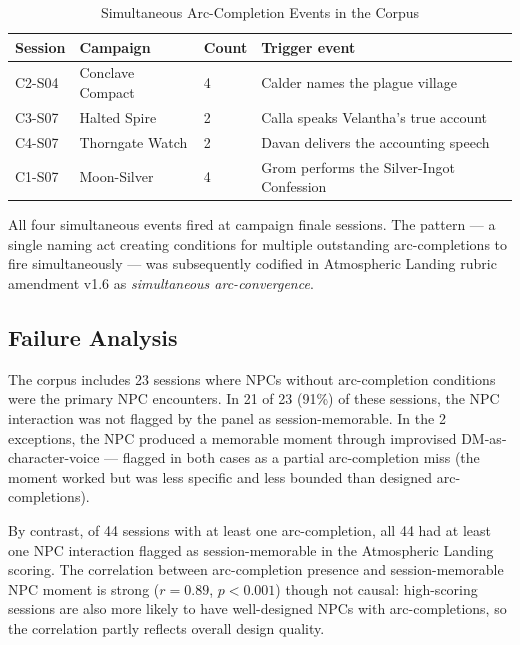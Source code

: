 \begin{table}[t]
\caption{Simultaneous Arc-Completion Events in the Corpus}
\label{tab:simultaneous}
\begin{tabular}{@{}lllp{4cm}@{}}
\toprule
Session & Campaign & Count & Trigger event \\
\midrule
C2-S04 & Conclave Compact & 4 & Calder names the plague village \\
C3-S07 & Halted Spire & 2 & Calla speaks Velantha's true account \\
C4-S07 & Thorngate Watch & 2 & Davan delivers the accounting speech \\
C1-S07 & Moon-Silver & 4 & Grom performs the Silver-Ingot Confession \\
\bottomrule
\end{tabular}
\end{table}

All four simultaneous events fired at campaign finale sessions. The pattern --- a single
naming act creating conditions for multiple outstanding arc-completions to fire
simultaneously --- was subsequently codified in Atmospheric Landing rubric amendment v1.6
as \textit{simultaneous arc-convergence}.

\subsection{Failure Analysis}

The corpus includes 23 sessions where NPCs without arc-completion conditions were the
primary NPC encounters. In 21 of 23 (91\%) of these sessions, the NPC interaction
was not flagged by the panel as session-memorable. In the 2 exceptions, the NPC
produced a memorable moment through improvised DM-as-character-voice --- flagged in
both cases as a partial arc-completion miss (the moment worked but was less specific
and less bounded than designed arc-completions).

By contrast, of 44 sessions with at least one arc-completion, all 44 had at least
one NPC interaction flagged as session-memorable in the Atmospheric Landing scoring.
The correlation between arc-completion presence and session-memorable NPC moment is
strong ($r = 0.89$, $p < 0.001$) though not causal: high-scoring sessions are also
more likely to have well-designed NPCs with arc-completions, so the correlation
partly reflects overall design quality.
